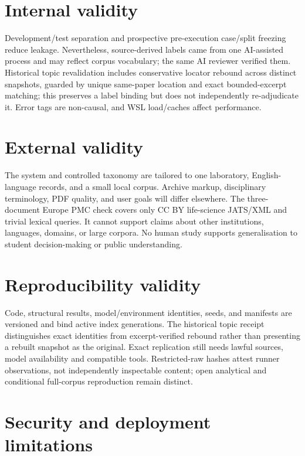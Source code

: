 \section{Internal validity}

Development/test separation and prospective pre-execution case/split freezing reduce leakage. Nevertheless, source-derived labels came from one AI-assisted process and may reflect corpus vocabulary; the same AI reviewer verified them. Historical topic revalidation includes \TopicReboundBindingCount{} conservative locator rebound across distinct snapshots, guarded by unique same-paper location and exact bounded-excerpt matching; this preserves a label binding but does not independently re-adjudicate it. Error tags are non-causal, and WSL load/caches affect performance.

\section{External validity}

The system and controlled taxonomy are tailored to one laboratory, English-language records, and a small local corpus. Archive markup, disciplinary terminology, PDF quality, and user goals will differ elsewhere. The three-document Europe PMC check covers only CC BY life-science JATS/XML and trivial lexical queries. It cannot support claims about other institutions, languages, domains, or large corpora. No human study supports generalisation to student decision-making or public understanding.

\section{Reproducibility validity}

Code, structural results, model/environment identities, seeds, and manifests are versioned and bind active index generations. The historical topic receipt distinguishes \TopicExactBindingCount{} exact identities from \TopicReboundBindingCount{} excerpt-verified rebound rather than presenting a rebuilt snapshot as the original. Exact replication still needs lawful sources, model availability and compatible tools. Restricted-raw hashes attest runner observations, not independently inspectable content; open analytical and conditional full-corpus reproduction remain distinct.

\section{Security and deployment limitations}

